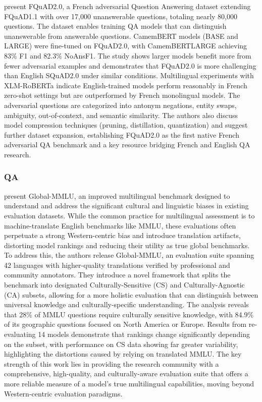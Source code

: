 \documentclass[acmsmall]{acmart}
\begin{document}
 \citep{heinrich-etal-2022-fquad2} present FQuAD2.0, a French adversarial Question Answering dataset extending FQuAD1.1 with over 17,000 unanswerable questions, totaling nearly 80,000 questions. The dataset enables training QA models that can distinguish unanswerable from answerable questions. CamemBERT models (BASE and LARGE) were fine-tuned on FQuAD2.0, with CamemBERTLARGE achieving 83\% F1 and 82.3\% NoAnsF1. The study shows larger models benefit more from fewer adversarial examples and demonstrates that FQuAD2.0 is more challenging than English SQuAD2.0 under similar conditions. Multilingual experiments with XLM-RoBERTa indicate English-trained models perform reasonably in French zero-shot settings but are outperformed by French monolingual models. The adversarial questions are categorized into antonym negations, entity swaps, ambiguity, out-of-context, and semantic similarity. The authors also discuss model compression techniques (pruning, distillation, quantization) and suggest further dataset expansion, establishing FQuAD2.0 as the first native French adversarial QA benchmark and a key resource bridging French and English QA research.

\subsubsection{QA}
\citep{singh2024global} present Global-MMLU, an improved multilingual benchmark designed to understand and address the significant cultural and linguistic biases in existing evaluation datasets. While the common practice for multilingual assessment is to machine-translate English benchmarks like MMLU, these evaluations often perpetuate a strong Western-centric bias and introduce translation artifacts, distorting model rankings and reducing their utility as true global benchmarks. To address this, the authors release Global-MMLU, an evaluation suite spanning 42 languages with higher-quality translations verified by professional and community annotators. They introduce a novel framework that splits the benchmark into designated Culturally-Sensitive (CS) and Culturally-Agnostic (CA) subsets, allowing for a more holistic evaluation that can distinguish between universal knowledge and culturally-specific understanding. The analysis reveals that 28\% of MMLU questions require culturally sensitive knowledge, with 84.9\% of its geographic questions focused on North America or Europe. Results from re-evaluating 14 models demonstrate that rankings change significantly depending on the subset, with performance on CS data showing far greater variability, highlighting the distortions caused by relying on translated MMLU. The key strength of this work lies in providing the research community with a comprehensive, high-quality, and culturally-aware evaluation suite that offers a more reliable measure of a model's true multilingual capabilities, moving beyond Western-centric evaluation paradigms.
\end{document}

